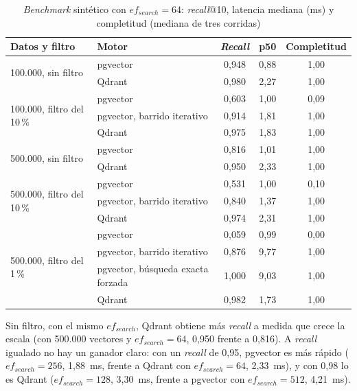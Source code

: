 \begin{table}[htbp!]
    \centering
    \caption{\textit{Benchmark} sintético con $ef_{search} = 64$: \textit{recall}@10, latencia mediana (ms) y completitud (mediana de tres corridas)}
    \label{tab:res-bench-sint}
    \small
    \begin{tabular}{|l|l|c|c|c|}
        \hline
        \textbf{Datos y filtro} & \textbf{Motor} & \textbf{\textit{Recall}} & \textbf{p50} & \textbf{Completitud} \\
        \hline
        \multirow{2}{*}{100.000, sin filtro} & pgvector & 0{,}948 & 0,88 & 1{,}00 \\
         & Qdrant & 0{,}980 & 2,27 & 1{,}00 \\
        \hline
        \multirow{3}{*}{100.000, filtro del 10\,\%} & pgvector & 0{,}603 & 1,00 & 0{,}09 \\
         & pgvector, barrido iterativo & 0{,}914 & 1,81 & 1{,}00 \\
         & Qdrant & 0{,}975 & 1,83 & 1{,}00 \\
        \hline
        \multirow{2}{*}{500.000, sin filtro} & pgvector & 0{,}816 & 1,01 & 1{,}00 \\
         & Qdrant & 0{,}950 & 2,33 & 1{,}00 \\
        \hline
        \multirow{3}{*}{500.000, filtro del 10\,\%} & pgvector & 0{,}531 & 1,00 & 0{,}10 \\
         & pgvector, barrido iterativo & 0{,}840 & 1,37 & 1{,}00 \\
         & Qdrant & 0{,}974 & 2,31 & 1{,}00 \\
        \hline
        \multirow{4}{*}{500.000, filtro del 1\,\%} & pgvector & 0{,}059 & 0,99 & 0{,}00 \\
         & pgvector, barrido iterativo & 0{,}876 & 9,77 & 1{,}00 \\
         & pgvector, búsqueda exacta forzada & 1{,}000 & 9,03 & 1{,}00 \\
         & Qdrant & 0{,}982 & 1,73 & 1{,}00 \\
        \hline
    \end{tabular}
\end{table}

Sin filtro, con el mismo $ef_{search}$, Qdrant obtiene más \textit{recall} a medida que crece la escala (con 500.000 vectores y $ef_{search} = 64$, 0,950 frente a 0,816). A \textit{recall} igualado no hay un ganador claro: con un \textit{recall} de 0,95, pgvector es más rápido ($ef_{search} = 256$, 1,88~ms, frente a Qdrant con $ef_{search} = 64$, 2,33~ms), y con 0,98 lo es Qdrant ($ef_{search} = 128$, 3,30~ms, frente a pgvector con $ef_{search} = 512$, 4,21~ms).

